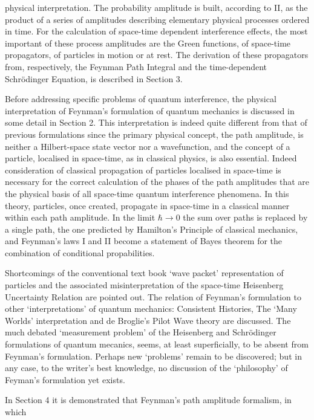 \documentclass [12pt]{article}
\begin{document}
{  physical interpretation. The probability amplitude is built, according to
  II, as the product of a series of amplitudes describing elementary physical 
   processes ordered in time. For the calculation of space-time dependent
  interference effects, the most important of these process amplitudes are the
  Green functions, of space-time propagators, of particles in motion or at rest.
  The derivation of these propagators from, respectively, the Feynman Path Integral
 and the time-dependent Schr\"{o}dinger Equation, is described in Section 3.
  \par Before addressing specific problems of quantum interference, the physical
  interpretation of Feynman's formulation of quantum mechanics is discussed in
  some detail in Section 2. This interpretation is indeed quite different from
  that of previous formulations since the primary physical concept,
  the path amplitude, is neither a Hilbert-space state vector nor 
  a wavefunction, and the concept of a particle, localised in space-time,
  as in classical physics, is also essential. Indeed consideration of classical 
  propagation of particles localised in space-time is necessary for the correct
  calculation of the phases of the path amplitudes that are the physical 
  basis of all space-time quantum interference phenomena. In this theory, particles,
  once created, propagate in space-time in a classical manner within each path
  amplitude. In the limit 
  $\hbar \rightarrow 0$ the sum over paths is replaced by a single path, the one
  predicted by Hamilton's Principle of classical mechanics,
   and Feynman's laws I and II become a statement
  of Bayes theorem for the combination of conditional propabilities. 
  \par Shortcomings
  of the conventional text book `wave packet' representation of particles and the associated
  misinterpretation of the space-time Heisenberg Uncertainty Relation are pointed out.
  The relation of Feynman's formulation to other `interpretations' of quantum mechanics:
  Consistent Histories, The `Many Worlds' interpretation and de Broglie's Pilot
  Wave theory are discussed. The much debated `measurement problem' of the
  Heisenberg and Schr\"{o}dinger formulations of quantum mecanics, seems, at least superficially, to be
  absent from Feynman's formulation. Perhaps new `problems' remain to be discovered; but in any case,
   to the writer's best knowledge, no
  discussion of the `philosophy' of Feyman's formulation  yet exists.
  \par In Section 4 it is demonstrated that Feynman's path amplitude formalism, in which
}
\end{document}
